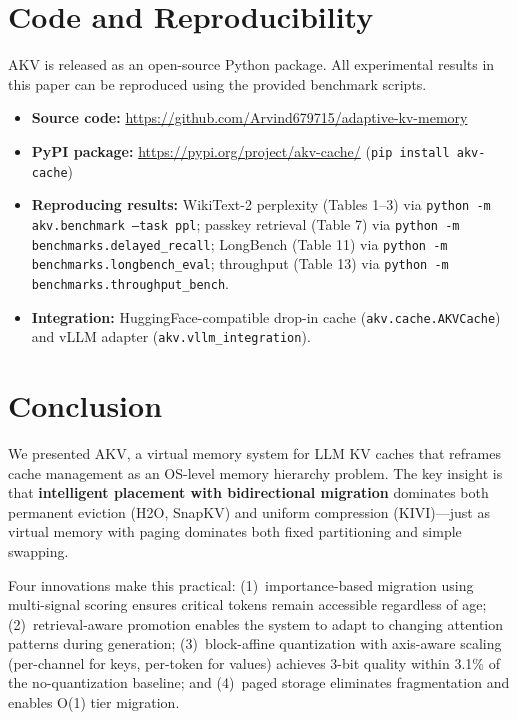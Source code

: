 \documentclass[11pt,a4paper]{article}
\begin{document}
\section{Code and Reproducibility}

AKV is released as an open-source Python package. All experimental results in this paper can be reproduced using the provided benchmark scripts.

\begin{itemize}
    \item \textbf{Source code:} \url{https://github.com/Arvind679715/adaptive-kv-memory}
    \item \textbf{PyPI package:} \url{https://pypi.org/project/akv-cache/} (\texttt{pip install akv-cache})
    \item \textbf{Reproducing results:} WikiText-2 perplexity (Tables 1--3) via \texttt{python -m akv.benchmark --task ppl}; passkey retrieval (Table 7) via \texttt{python -m benchmarks.delayed\_recall}; LongBench (Table 11) via \texttt{python -m benchmarks.longbench\_eval}; throughput (Table 13) via \texttt{python -m benchmarks.throughput\_bench}.
    \item \textbf{Integration:} HuggingFace-compatible drop-in cache (\texttt{akv.cache.AKVCache}) and vLLM adapter (\texttt{akv.vllm\_integration}).
\end{itemize}

\section{Conclusion}

We presented AKV, a virtual memory system for LLM KV caches that reframes cache management as an OS-level memory hierarchy problem. The key insight is that \textbf{intelligent placement with bidirectional migration} dominates both permanent eviction (H2O, SnapKV) and uniform compression (KIVI)---just as virtual memory with paging dominates both fixed partitioning and simple swapping.

Four innovations make this practical: (1)~importance-based migration using multi-signal scoring ensures critical tokens remain accessible regardless of age; (2)~retrieval-aware promotion enables the system to adapt to changing attention patterns during generation; (3)~block-affine quantization with axis-aware scaling (per-channel for keys, per-token for values) achieves 3-bit quality within 3.1\% of the no-quantization baseline; and (4)~paged storage eliminates fragmentation and enables O(1) tier migration.
\end{document}
